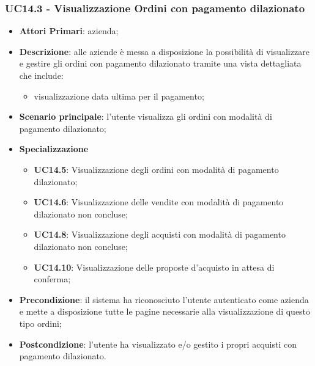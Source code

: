 \subsubsection{UC14.3 - Visualizzazione Ordini con pagamento dilazionato}
\begin{itemize}
	\item \textbf{Attori Primari}: azienda;
	\item \textbf{Descrizione}: alle aziende è messa a disposizione la possibilità di visualizzare e gestire gli ordini con pagamento dilazionato tramite una vista dettagliata che include: 
	\begin{itemize}
		\item visualizzazione data ultima per il pagamento;
	\end{itemize}
	\item \textbf{Scenario principale}: l'utente visualizza gli ordini con modalità di pagamento dilazionato;
			\item \textbf{Specializzazione}
	\begin{itemize}
		\item \textbf{UC14.5}: Visualizzazione degli ordini con modalità di pagamento dilazionato;
		\item \textbf{UC14.6}: Visualizzazione delle vendite con modalità di pagamento dilazionato non concluse;
		\item \textbf{UC14.8}: Visualizzazione degli acquisti con modalità di pagamento dilazionato non concluse;
		\item \textbf{UC14.10}: Visualizzazione delle proposte d'acquisto in attesa di conferma;
	\end{itemize}
	\item \textbf{Precondizione}: il sistema ha riconosciuto l'utente autenticato come azienda e mette a disposizione tutte le pagine necessarie alla visualizzazione di questo tipo ordini;
	\item \textbf{Postcondizione}: l'utente ha visualizzato e/o gestito i propri acquisti con pagamento dilazionato.
\end{itemize} 

